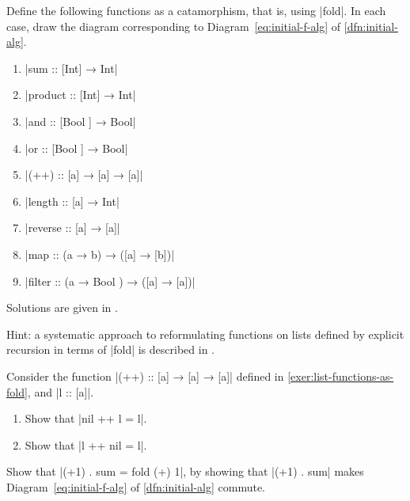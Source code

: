 \begin{exer}\label{exer:list-functions-as-fold}
  Define the following functions as a catamorphism, that is, using |fold|.
  In each case, draw the diagram corresponding to Diagram~\ref{eq:initial-f-alg} of \cref{dfn:initial-alg}.
  \begin{enumerate}
  \item |sum :: [Int] →  Int|
  \item |product :: [Int] →  Int|
  \item |and :: [Bool ] →  Bool|
  \item |or :: [Bool ] →  Bool|
  \item |(++) :: [a] →  [a] →  [a]|
  \item |length :: [a] →  Int|
  \item |reverse :: [a] →  [a]|
  \item |map :: (a →  b) →  ([a] →  [b])|
  \item |filter :: (a →  Bool ) →  ([a] →  [a])|
  \end{enumerate}
  Solutions are given in \cite[\S2]{DBLP:journals/jfp/Hutton99}.

  Hint: a systematic approach to reformulating functions on lists defined by explicit recursion in terms of |fold| is described in \cite[\S3.3]{DBLP:journals/jfp/Hutton99}.
\end{exer}

\begin{exer}
  \label{exer:list-concat-nil}
  Consider the function |(++) :: [a] →  [a] →  [a]| defined in \cref{exer:list-functions-as-fold},
  and |l :: [a]|.
  \begin{enumerate}
  \item Show that |nil ++ l = l|.
    
  \item Show that |l ++ nil = l|.
  \end{enumerate}
\end{exer}

\begin{exer}
  Show that |(+1) . sum = fold (+) 1|, by showing that |(+1) . sum| makes Diagram~\ref{eq:initial-f-alg} of \cref{dfn:initial-alg} commute.
\end{exer}

